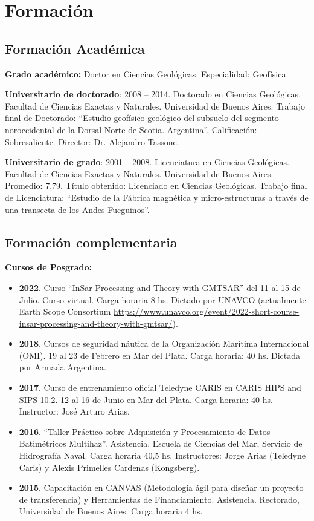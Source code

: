 \documentclass[11pt, a4paper]{article}
\begin{document}
\section{Formación}


\subsection{Formación Académica}

\textbf{Grado académico:} Doctor en Ciencias Geológicas. Especialidad: Geofísica.

\textbf{Universitario de doctorado}: 2008 – 2014. Doctorado en Ciencias Geológicas. Facultad de Ciencias Exactas y Naturales. Universidad de Buenos Aires. Trabajo final de Doctorado: “Estudio geofísico-geológico del subsuelo del segmento noroccidental de la Dorsal Norte de Scotia. Argentina”. Calificación: Sobresaliente. Director: Dr. Alejandro Tassone.

\textbf{Universitario de grado}: 2001 – 2008. Licenciatura en Ciencias Geológicas. Facultad de Ciencias Exactas y Naturales. Universidad de Buenos Aires. Promedio: 7,79. Título obtenido: Licenciado en Ciencias Geológicas. Trabajo final de Licenciatura: “Estudio de la Fábrica magnética y micro-estructuras a través de una transecta de los Andes Fueguinos”.


\subsection{Formación complementaria}

\textbf{Cursos de Posgrado:}

\begin{itemize}
    \item \textbf{2022}. Curso “InSar Processing and Theory with GMTSAR” del 11 al 15 de Julio. Curso virtual. Carga horaria 8 hs. Dictado por UNAVCO (actualmente Earth Scope Consortium \url{https://www.unavco.org/event/2022-short-course-insar-processing-and-theory-with-gmtsar/}).
    \item \textbf{2018}. Cursos de seguridad náutica de la Organización Marítima Internacional (OMI). 19 al 23 de Febrero en Mar del Plata. Carga horaria: 40 hs. Dictada por Armada Argentina.
    \item \textbf{2017}. Curso de entrenamiento oficial Teledyne CARIS en CARIS HIPS and SIPS 10.2. 12 al 16 de Junio en Mar del Plata. Carga horaria: 40 hs. Instructor: José Arturo Arias.
    \item \textbf{2016}. “Taller Práctico sobre Adquisición y Procesamiento de Datos Batimétricos Multihaz”. Asistencia. Escuela de Ciencias del Mar, Servicio de Hidrografía Naval. Carga horaria 40,5 hs. Instructores: Jorge Arias (Teledyne Caris) y Alexis Primelles Cardenas (Kongsberg).
    \item \textbf{2015}. Capacitación en CANVAS (Metodología ágil para diseñar un proyecto de transferencia) y Herramientas de Financiamiento. Asistencia. Rectorado, Universidad de Buenos Aires. Carga horaria 4 hs.
\end{itemize}
\end{document}

